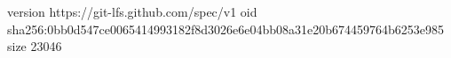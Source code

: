 version https://git-lfs.github.com/spec/v1
oid sha256:0bb0d547ce0065414993182f8d3026e6e04bb08a31e20b674459764b6253e985
size 23046
